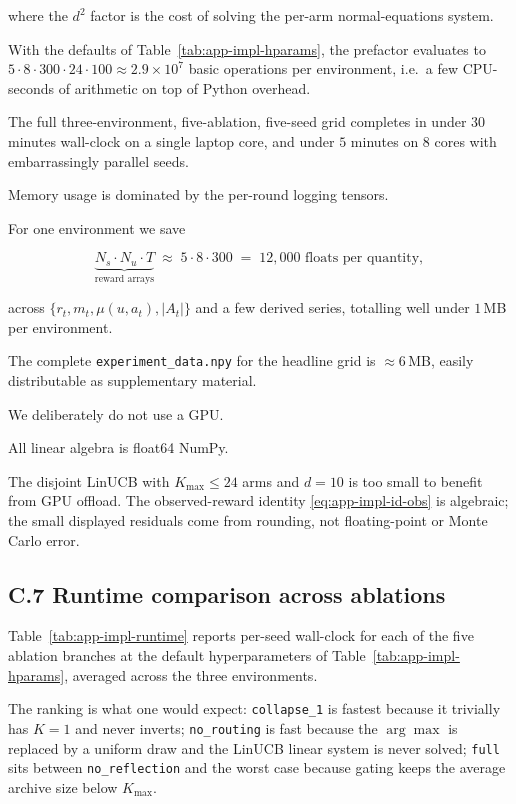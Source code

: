 \documentclass{article} %
\begin{document}
where the $d^2$ factor is the cost of solving the per-arm normal-equations system.

With the defaults of Table~\ref{tab:app-impl-hparams}, the prefactor evaluates to $5 \cdot 8 \cdot 300 \cdot 24 \cdot 100 \approx 2.9 \times 10^7$ basic operations per environment, i.e.\ a few CPU-seconds of arithmetic on top of Python overhead.

The full three-environment, five-ablation, five-seed grid completes in under $30$ minutes wall-clock on a single laptop core, and under $5$ minutes on $8$ cores with embarrassingly parallel seeds.

Memory usage is dominated by the per-round logging tensors.

For one environment we save

\begin{equation}
\label{eq:app-impl-storage}
\underbrace{N_s \cdot N_u \cdot T}_{\text{reward arrays}} \;\approx\; 5 \cdot 8 \cdot 300 \;=\; 12{,}000 \text{ floats per quantity},
\end{equation}

across $\{r_t, m_t, \mu(u,a_t), |A_t|\}$ and a few derived series, totalling well under $1$\,MB per environment.

The complete \texttt{experiment\_data.npy} for the headline grid is $\approx 6$\,MB, easily distributable as supplementary material.

We deliberately do not use a GPU.

All linear algebra is float64 NumPy.

The disjoint LinUCB with \(K_{\max}\le24\) arms and \(d=10\) is too small to
benefit from GPU offload. The observed-reward identity
\eqref{eq:app-impl-id-obs} is algebraic; the small displayed residuals come
from rounding, not floating-point or Monte Carlo error.

\subsection{C.7 Runtime comparison across ablations}

\label{app:impl-runtime}

Table~\ref{tab:app-impl-runtime} reports per-seed wall-clock for each of the five ablation branches at the default hyperparameters of Table~\ref{tab:app-impl-hparams}, averaged across the three environments.

The ranking is what one would expect: \texttt{collapse\_1} is fastest because it trivially has $K=1$ and never inverts; \texttt{no\_routing} is fast because the $\arg\max$ is replaced by a uniform draw and the LinUCB linear system is never solved; \texttt{full} sits between \texttt{no\_reflection} and the worst case because gating keeps the average archive size below $K_{\max}$.
\end{document}
